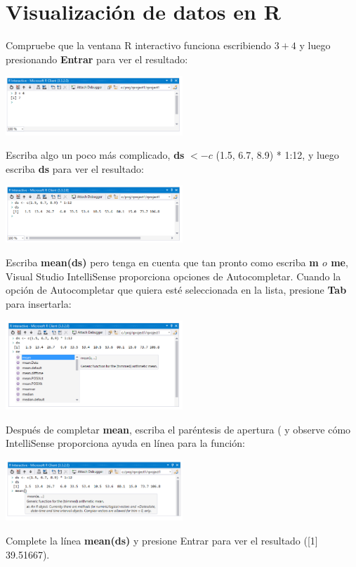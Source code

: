 \documentclass{article}
\begin{document}
\section{Visualización de datos en R}
Compruebe que la ventana R interactivo funciona escribiendo $3 + 4$ y luego presionando \textbf{Entrar} para ver el resultado:
\begin{center}
\includegraphics[width=0.5\textwidth]{anúgwe/C1.PNG}
\end{center}
 Escriba algo un poco más complicado, \textbf{ds} $< - c$ (1.5, 6.7, 8.9) * 1:12, y luego escriba \textbf{ds} para ver el resultado:
\begin{center}
\includegraphics[width=0.5\textwidth]{anúgwe/C2.PNG}
\end{center}
 Escriba \textbf{mean(ds)} pero tenga en cuenta que tan pronto como escriba \textbf{m $o$ me}, Visual Studio IntelliSense proporciona opciones de Autocompletar. Cuando la opción de Autocompletar que quiera esté seleccionada en la lista, presione \textbf{Tab} para insertarla:
  \begin{center}
\includegraphics[width=0.5\textwidth]{anúgwe/C3.PNG}
\end{center}
Después de completar \textbf{mean}, escriba el paréntesis de apertura ( y observe cómo IntelliSense proporciona ayuda en línea para la función:
\begin{center}
\includegraphics[width=0.5\textwidth]{anúgwe/C4.PNG}
\end{center}
Complete la línea \textbf{mean(ds)} y presione Entrar para ver el resultado ([1] 39.51667).
\\
\end{document}
